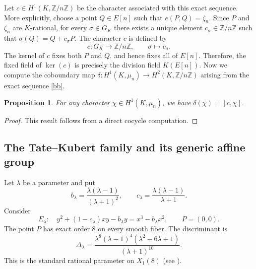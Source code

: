 \documentclass[11pt,a4paper]{amsart}
\newtheorem{proposition}[theorem]{Proposition}
\theoremstyle{definition}
\numberwithin{equation}{section}
\begin{document}
Let $c\in H^1(K,\mathbb{Z}/n\mathbb{Z})$ be the character associated with this exact sequence. More explicitly, choose a point $Q\in E[n]$ such that $e(P,Q)=\zeta_n$. Since $P$ and
$\zeta_n$ are $K$-rational, for every $\sigma\in G_K$ there exists a unique element $c_\sigma\in\mathbb{Z}/n\mathbb{Z}$ such that
$
\sigma(Q)=Q+c_\sigma P.
$
The character $c$ is defined by
\[
c:G_K\longrightarrow \mathbb{Z}/n\mathbb{Z},
\qquad
\sigma\longmapsto c_\sigma .
\]
The kernel of $c$ fixes both $P$ and $Q$, and hence fixes all of $E[n]$.
Therefore, the fixed field of $\ker(c)$ is precisely the division field
$K(E[n])$.
Now we compute the coboundary map $\delta: H^1(K,\mu_n)\rightarrow H^2(K,\mathbb{Z}/n\mathbb{Z})$ arising from  the exact sequence \eqref{bb}.
\begin{proposition}\label{connect}
	For any character $\chi \in H^1(K,\mu_n)$, we have $\delta(\chi)=[c,\chi]$.
\end{proposition}
\begin{proof}
 This result follows from a direct cocycle computation.
\end{proof}
\subsection{The Tate--Kubert family and its generic affine group}

Let $\lambda$ be a parameter and put
\begin{equation*}\label{eq:bc-lambda}
 b_\lambda=\frac{\lambda(\lambda-1)}{(\lambda+1)^2},
 \qquad
 c_\lambda=\frac{\lambda(\lambda-1)}{\lambda+1}.
\end{equation*}
Consider
\begin{equation*}\label{eq:Tate-family}
 E_\lambda:\quad
 y^2+(1-c_\lambda)xy-b_\lambda y
 =x^3-b_\lambda x^2,
 \qquad P=(0,0).
\end{equation*}
The point $P$ has exact order $8$ on every smooth fiber.  The
discriminant is
\begin{equation*}\label{eq:family-disc}
 \Delta_\lambda
 =\frac{\lambda^8(\lambda-1)^4
 (\lambda^2-6\lambda+1)}{(\lambda+1)^{10}}.
\end{equation*}
This is the
standard rational parameter on $X_1(8)$ (see \cite{AntieauAuel,Kubert,x18}).
\end{document}
